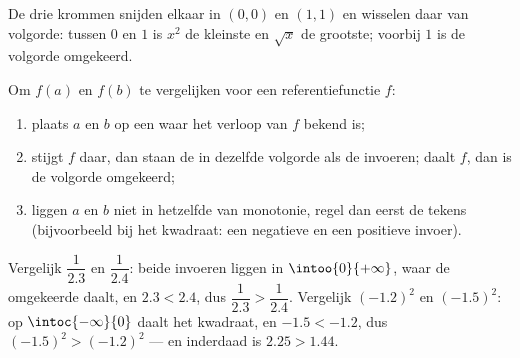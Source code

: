 \begin{omfigure}

{\small De drie krommen snijden elkaar in $(0,0)$ en $(1,1)$ en wisselen daar
van volgorde: tussen $0$ en $1$ is $x^2$ de kleinste en $\sqrt x$ de
grootste; voorbij $1$ is de volgorde omgekeerd.}
\end{omfigure}

\begin{method}\label{met:g10:reffunc:compare}
Om $f(a)$ en $f(b)$ te vergelijken voor een referentiefunctie $f$:
\begin{enumerate}
  \item plaats $a$ en $b$ op een  waar het verloop van $f$ bekend is;
  \item stijgt $f$ daar, dan staan de  in dezelfde volgorde als de
        invoeren; daalt $f$, dan is de volgorde omgekeerd;
  \item liggen $a$ en $b$ niet in hetzelfde  van monotonie, regel dan
        eerst de tekens (bijvoorbeeld bij het kwadraat: een negatieve en een
        positieve invoer).
\end{enumerate}
\end{method}

\begin{example}
Vergelijk $\dfrac{1}{2.3}$ en $\dfrac{1}{2.4}$: beide invoeren liggen in
$\intoo{0}{+\infty}$, waar de omgekeerde  daalt, en $2.3 < 2.4$, dus
$\dfrac{1}{2.3} > \dfrac{1}{2.4}$. Vergelijk $(-1.2)^2$ en $(-1.5)^2$: op
$\intoc{-\infty}{0}$ daalt het kwadraat, en $-1.5 < -1.2$, dus
$(-1.5)^2 > (-1.2)^2$ --- en inderdaad is $2.25 > 1.44$.
\end{example}

